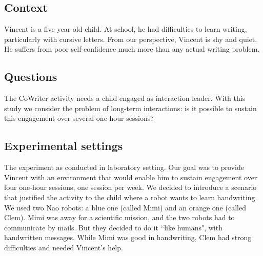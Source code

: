 \documentclass{sig-alternate}
\begin{document}
\subsection{Context}
Vincent is a five year-old child. At school, he had difficulties to learn writing, particularly with cursive letters. From our perspective, Vincent is shy and quiet. He suffers from poor self-confidence much more than any actual writing problem.

\subsection{Questions}

The CoWriter activity needs a child engaged as interaction leader. 
With this study we consider the problem of long-term interactions: is it possible to
sustain this engagement over several one-hour sessions?

%

\subsection{Experimental settings}

The experiment as conducted in laboratory setting. Our goal was to provide Vincent with
an environment that would enable him to sustain engagement over four one-hour sessions, 
one session per week. We decided 
to introduce a scenario that justified the activity to the child
where a robot wants to learn handwriting. We used two Nao robots: a blue one 
(called Mimi) and an orange one (called Clem). Mimi was away for a 
scientific mission, and the two robots had to communicate by mails. But they decided to do it 
``like humans", with handwritten messages. While Mimi was good in handwriting, 
Clem had strong difficulties and needed Vincent's help.
\end{document}
